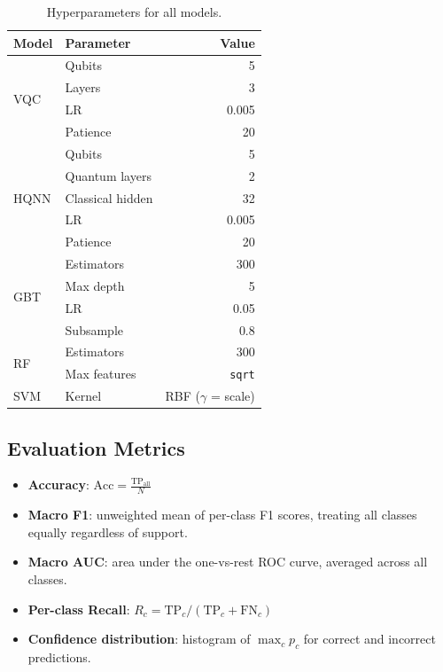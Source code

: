 \documentclass[12pt, a4paper]{article}
\begin{document}
\begin{table}[H]
\centering
\caption{Hyperparameters for all models.}
\label{tab:hyperparams}
\begin{tabular}{llr}
\toprule
\textbf{Model} & \textbf{Parameter} & \textbf{Value} \\
\midrule
\multirow{4}{*}{VQC}  & Qubits   & 5 \\
                      & Layers   & 3 \\
                      & LR       & 0.005 \\
                      & Patience & 20 \\
\midrule
\multirow{5}{*}{HQNN} & Qubits         & 5 \\
                      & Quantum layers & 2 \\
                      & Classical hidden & 32 \\
                      & LR             & 0.005 \\
                      & Patience       & 20 \\
\midrule
\multirow{4}{*}{GBT}  & Estimators  & 300 \\
                      & Max depth   & 5 \\
                      & LR          & 0.05 \\
                      & Subsample   & 0.8 \\
\midrule
\multirow{2}{*}{RF}   & Estimators  & 300 \\
                      & Max features & \texttt{sqrt} \\
\midrule
SVM  & Kernel & RBF ($\gamma$ = scale) \\
\bottomrule
\end{tabular}
\end{table}

\subsection{Evaluation Metrics}

\begin{itemize}
    \item \textbf{Accuracy}: $\text{Acc} = \frac{\text{TP}_{\text{all}}}{N}$
    \item \textbf{Macro F1}: unweighted mean of per-class F1 scores,
          treating all classes equally regardless of support.
    \item \textbf{Macro AUC}: area under the one-vs-rest ROC curve, averaged
          across all classes.
    \item \textbf{Per-class Recall}: $R_c = \text{TP}_c / (\text{TP}_c + \text{FN}_c)$
    \item \textbf{Confidence distribution}: histogram of $\max_c p_c$ for correct
          and incorrect predictions.
\end{itemize}
\end{document}
